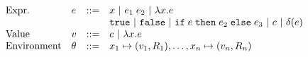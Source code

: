 \documentclass[a4paper,11pt]{article}
\newcommand{\wq}[1]{\textcolor[rgb]{.50,0.0,0.7}{ #1}}
\theoremstyle{definition}
\begin{document}

\[\begin{array}{llll}
\mbox{Expr.} & \expr & ::= & x ~|~ \expr_1 \eapp \expr_2 
 ~|~ \lambda x. \expr 
    \\
             & & &  \etrue ~|~ \efalse ~|~
  \eif  \expr \ethen \expr_2 \eelse \expr_3 ~|~
\econst ~|~ \eop(\expr)  %
    \\
%
\mbox{Value} & \valr & ::= & \econst ~|~ \lambda x. \expr
    \\
%
\mbox{Environment} & \env & ::= & x_1 \mapsto (\valr_1, \adapt_1), \ldots, x_n \mapsto (\valr_n,\adapt_n)
\end{array}\]
\end{document}
